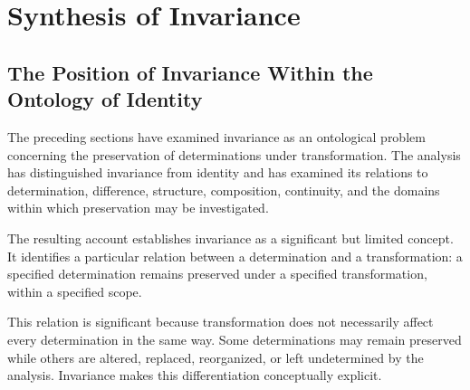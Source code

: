 %
%
%
%
%

\section{Synthesis of Invariance}
\label{sec:synthesis-of-invariance}

\subsection{The Position of Invariance Within the Ontology of Identity}

The preceding sections have examined invariance as an
ontological problem concerning the preservation of
determinations under transformation. The analysis has
distinguished invariance from identity and has examined
its relations to determination, difference, structure,
composition, continuity, and the domains within which
preservation may be investigated.

The resulting account establishes invariance as a
significant but limited concept. It identifies a particular
relation between a determination and a transformation:
a specified determination remains preserved under a
specified transformation, within a specified scope.

This relation is significant because transformation does
not necessarily affect every determination in the same
way. Some determinations may remain preserved while
others are altered, replaced, reorganized, or left
undetermined by the analysis. Invariance makes this
differentiation conceptually explicit.

